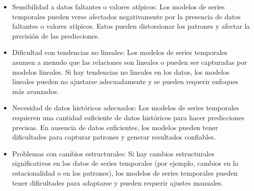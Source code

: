 \begin{itemize}
    \item Sensibilidad a datos faltantes o valores atípicos: Los modelos de series temporales pueden verse afectados negativamente por la presencia de datos faltantes o valores atípicos. Estos pueden distorsionar los patrones y afectar la precisión de las predicciones.
    \item Dificultad con tendencias no lineales: Los modelos de series temporales asumen a menudo que las relaciones son lineales o pueden ser capturadas por modelos lineales. Si hay tendencias no lineales en los datos, los modelos lineales pueden no ajustarse adecuadamente y se pueden requerir enfoques más avanzados.
    \item Necesidad de datos históricos adecuados: Los modelos de series temporales requieren una cantidad suficiente de datos históricos para hacer predicciones precisas. En ausencia de datos suficientes, los modelos pueden tener dificultades para capturar patrones y generar resultados confiables.
    \item Problemas con cambios estructurales: Si hay cambios estructurales significativos en los datos de series temporales (por ejemplo, cambios en la estacionalidad o en los patrones), los modelos de series temporales pueden tener dificultades para adaptarse y pueden requerir ajustes manuales.
\end{itemize}